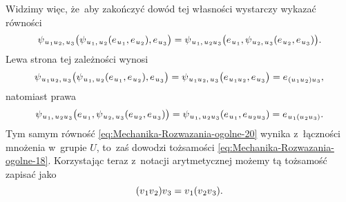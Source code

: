 \documentclass[a4paper,11pt]{article}
\numberwithin{equation}{section}
\begin{document}
\noindent
Widzimy więc, że~aby zakończyć dowód tej własności wystarczy wykazać
równości
\begin{equation}
  \label{eq:Mechanika-Rozwazania-ogolne-22}
  \psi_{ \hspace{0.07em} u_{ \hspace{0.05em} 1 } u_{ \hspace{0.05em} 2 }, \,
    u_{ \hspace{0.05em} 3 } }\big(
  \psi_{ \hspace{0.07em} u_{ \hspace{0.05em} 1 }, \, u_{ \hspace{0.05em} 2 } }(
  e_{ \hspace{0.07em} u_{ \hspace{0.05em} 1 } }, e_{ \hspace{0.07em} u_{ \hspace{0.05em} 2 } } ),
  e_{ \hspace{0.07em} u_{ \hspace{0.05em} 3 } } \big) =
  \psi_{ \hspace{0.07em} u_{ \hspace{0.05em} 1 }, \,
    u_{ \hspace{0.05em} 2 } u_{ \hspace{0.05em} 3 } }\big(
  e_{ \hspace{0.07em} u_{ \hspace{0.05em} 1 } },
  \psi_{ \hspace{0.07em} u_{ \hspace{0.05em} 2 }, \, u_{ \hspace{0.05em} 3 } }(
  e_{ \hspace{0.07em} u_{ \hspace{0.05em} 2 } }, e_{ \hspace{0.07em} u_{ \hspace{0.05em} 3 } } )
  \big).
\end{equation}
Lewa strona tej zależności wynosi
\begin{equation}
  \label{eq:Mechanika-Rozwazania-ogolne-23}
  \psi_{ \hspace{0.07em} u_{ \hspace{0.05em} 1 } u_{ \hspace{0.05em} 2 }, \,
    u_{ \hspace{0.05em} 3 } }\big(
  \psi_{ \hspace{0.07em} u_{ \hspace{0.05em} 1 }, \, u_{ \hspace{0.05em} 2 } }(
  e_{ \hspace{0.07em} u_{ \hspace{0.05em} 1 } },
  e_{ \hspace{0.07em} u_{ \hspace{0.05em} 2 } } ),
  e_{ \hspace{0.07em} u_{ \hspace{0.05em} 3 } } \big) =
  \psi_{ \hspace{0.07em} u_{ \hspace{0.05em} 1 } u_{ \hspace{0.05em} 2 }, \,
    u_{ \hspace{0.05em} 3 } }\big(
  e_{ \hspace{0.07em} u_{ \hspace{0.05em} 1 } u_{ \hspace{0.05em} 2 } },
  e_{ \hspace{0.07em} u_{ \hspace{0.05em} 3 } } \big) =
  e_{ \hspace{0.07em} ( u_{ \hspace{0.05em} 1 } u_{ \hspace{0.05em} 2 } )
    u_{ \hspace{0.05em} 3 } },
\end{equation}
natomiast prawa
\begin{equation}
  \label{eq:Mechanika-Rozwazania-ogolne-24}
  \psi_{ \hspace{0.07em} u_{ \hspace{0.05em} 1 }, \,
    u_{ \hspace{0.05em} 2 } u_{ \hspace{0.05em} 3 } }\big(
  e_{ \hspace{0.07em} u_{ \hspace{0.05em} 1 } },
  \psi_{ \hspace{0.07em} u_{ \hspace{0.05em} 2 }, \, u_{ \hspace{0.05em} 3 } }(
  e_{ \hspace{0.07em} u_{ \hspace{0.05em} 2 } }, e_{ \hspace{0.07em} u_{ \hspace{0.05em} 3 } } )
  \big) =
  \psi_{ \hspace{0.07em} u_{ \hspace{0.05em} 1 }, \,
    u_{ \hspace{0.05em} 2 } u_{ \hspace{0.05em} 3 } }(
  e_{ \hspace{0.07em} u_{ \hspace{0.05em} 1 } },
  e_{ \hspace{0.07em} u_{ \hspace{0.05em} 2 } u_{ \hspace{0.05em} 3 } } ) =
  e_{ \hspace{0.07em} u_{ \hspace{0.05em} 1 } ( u_{ \hspace{0.05em} 2 }
    u_{ \hspace{0.05em} 3 } ) }.
\end{equation}
Tym samym równość \eqref{eq:Mechanika-Rozwazania-ogolne-20} wynika
z~łączności mnożenia w~grupie $U$, to~zaś dowodzi tożsamości
\eqref{eq:Mechanika-Rozwazania-ogolne-18}. Korzystając teraz z~notacji
arytmetycznej możemy tą tożsamość zapisać jako
\begin{equation}
  \label{eq:Mechanika-Rozwazania-ogolne-25}
  ( v_{ \hspace{0.05em} 1 } v_{ \hspace{0.05em} 2 } ) v_{ \hspace{0.05em} 3 } =
  v_{ \hspace{0.05em} 1 } ( v_{ \hspace{0.05em} 2 } v_{ \hspace{0.05em} 3 } ).
\end{equation}
\end{document}

